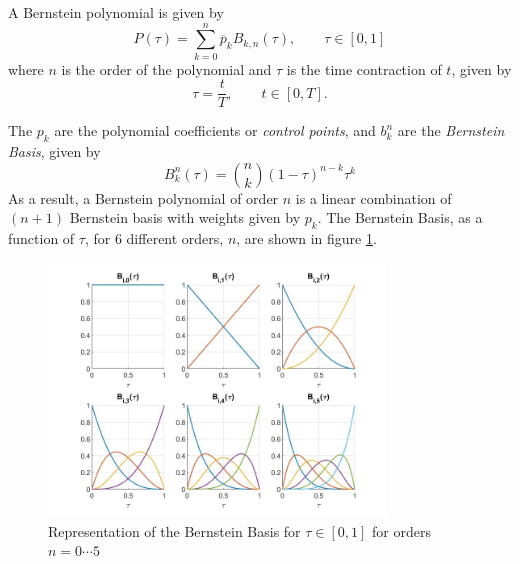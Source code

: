 \par A Bernstein polynomial is given by %
\begin{equation}
    \label{eq:bern_pol}
    P(\tau) = \sum_{k=0}^n \overline{p}_k B_{k,n} (\tau), \qquad \tau\in [0,1]
\end{equation}
where $n$ is the order of the polynomial and $\tau$ is the time contraction of $t$, given by 
\begin{equation}
    \tau = \frac{t}{T}, \qquad t\in [0,T].
    \label{eq:time_delay}
\end{equation}
\par The $p_k$ are the polynomial coefficients or \textit{control points}, and $b_k^n$ are the \textit{Bernstein Basis}, given by 
\begin{equation}
	B^n_k {(\tau)} = \binom{n}{k} {(1 - \tau)}^{n-k} \tau^k
    \label{eq:bern_basis}
\end{equation}
As a result, a Bernstein polynomial of order $n$ is a linear combination of $(n+1)$ Bernstein basis with weights given by $p_k$. The Bernstein Basis, as a function of $\tau$, for 6 different orders, $n$, are shown in figure \ref{fig:bernsteinbasis}.

\begin{figure}[h!]
\centering
\includegraphics[width=0.8\textwidth]{Images/bernstein_basis.jpg}
\caption{Representation of the Bernstein Basis for $\tau \in [0,1]$ for orders $n=0\cdots 5$}
\label{fig:bernsteinbasis}
\end{figure}

